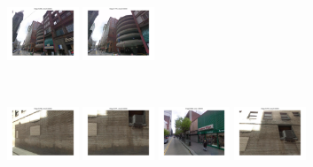 \begin{figure}[t!]
\begin{minipage}{0.75\linewidth}
\begin{minipage}{\linewidth}
                \colorbox{myGreen}{\includegraphics[trim = 35mm 30mm 35mm 30mm, clip=true, height=16mm]{imgs/Pval/exImproved04/improvedPval03.jpg}}
                \colorbox{myGreen}{\includegraphics[trim = 35mm 30mm 35mm 30mm, clip=true, height=16mm]{imgs/Pval/exImproved04/improvedPval04.jpg}}
            \end{minipage}
            \\
            \begin{minipage}{\linewidth}
                \colorbox{myRed}{\includegraphics[trim = 35mm 30mm 35mm 30mm, clip=true, height=16mm]{imgs/Pval/exImproved04/improved01.jpg}}
                \colorbox{myRed}{\includegraphics[trim = 35mm 30mm 35mm 30mm, clip=true, height=16mm]{imgs/Pval/exImproved04/improved02.jpg}}
                \colorbox{myRed}{\includegraphics[trim = 35mm 30mm 35mm 30mm, clip=true, height=16mm]{imgs/Pval/exImproved04/improved03.jpg}}
                \colorbox{myRed}{\includegraphics[trim = 35mm 30mm 35mm 30mm, clip=true, height=16mm]{imgs/Pval/exImproved04/improved04.jpg}}
            \end{minipage} 
        \end{minipage}
        \vspace{3mm}
        \\

\end{figure}

